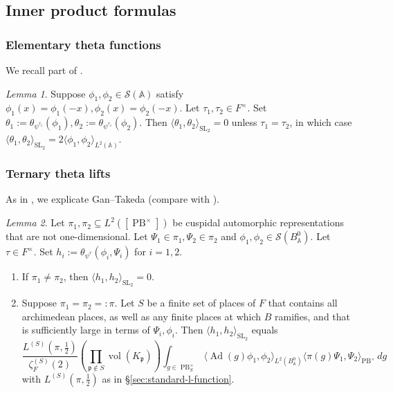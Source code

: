 \documentclass[reqno,10pt]{amsart}
\theoremstyle{plain} %
\theoremstyle{definition}
\theoremstyle{plain} %
\theoremstyle{remark}
\theoremstyle{itplain} %
\newtheorem*{lemma*}{Lemma}
\theoremstyle{remark} %
\numberwithin{equation}{section}
\DeclareMathOperator{\SL}{SL}
\DeclareMathOperator{\Ad}{Ad}
\def\PB{\operatorname{PB}}
\DeclareMathOperator{\vol}{vol}
\begin{document}
\subsection{Inner product formulas}
\label{sec-3-7}

\subsubsection{Elementary theta functions}\label{sec:elem-theta-ipf}
We recall part of \cite[Thm 2]{nelson-theta-squared}.
\begin{lemma*}
  Suppose $\phi_1, \phi_2 \in \mathcal{S}(\mathbb{A})$ satisfy $\phi_1(x) = \phi_1(-x), \phi_2(x) = \phi_2(-x)$.  Let $\tau_1, \tau_2 \in F^\times$.  Set $\theta_1 := \theta_{\psi^{\tau_1}}(\phi_1), \theta_2 := \theta_{\psi^{\tau_1}}(\phi_2)$.  Then $\langle \theta_1, \theta_2 \rangle_{\SL_2}= 0$ unless $\tau_1 = \tau_2$, in which case $\langle \theta_1, \theta_2 \rangle_{\SL_2} = 2 \langle \phi_1, \phi_2 \rangle_{L^2(\mathbb{A})}$.
\end{lemma*}
\subsubsection{Ternary theta lifts}\label{sec:ternary-theta-ipf}
As in \cite[\S12.3]{nelson-variance-73-2}, we explicate Gan--Takeda \cite[Thm 6.6]{MR2837015} (compare with \cite[Prop 2.8 (i)]{MR3291638}).
\begin{lemma*}
  Let $\pi_1, \pi_2 \subseteq L^2([\PB^\times])$ be cuspidal automorphic representations that are not one-dimensional.  Let $\Psi_1 \in \pi_1, \Psi_2 \in \pi_2$ and $\phi_1, \phi_2 \in \mathcal{S}(B_\mathbb{A}^0)$.  Let $\tau \in F^\times$.  Set $h_i := \theta_{\psi^{\tau}}(\phi_i,\Psi_i)$ for $i=1,2$.
  \begin{enumerate}
  \item If $\pi_1 \neq \pi_2$, then $\langle h_1, h_2 \rangle_{\SL_2} = 0$.
  \item Suppose $\pi_1 = \pi_2 =: \pi$.  Let $S$ be a finite set of places of $F$ that contains all archimedean places, as well as any finite places at which $B$ ramifies, and that is sufficiently large in terms of $\Psi_i, \phi_i$.
    Then $\langle h_1, h_2 \rangle_{\SL_2}$ equals
    \begin{equation}
      \frac{L^{(S)}(\pi,\tfrac{1}{2})}{\zeta_F^{(S)}(2)} \left(\prod_{\mathfrak{p} \notin S} \vol(K_\mathfrak{p}) \right) \int_{g \in \PB^\times_S} \langle \Ad(g) \phi_1, \phi_2 \rangle_{L^2(B_\mathbb{A}^0)} \langle \pi(g) \Psi_1, \Psi_2 \rangle_{\PB^\times} \, d g
    \end{equation}
    with $L^{(S)}(\pi,\tfrac{1}{2})$ as in \S\ref{sec:standard-l-function}.
  \end{enumerate}
\end{lemma*}
\end{document}
